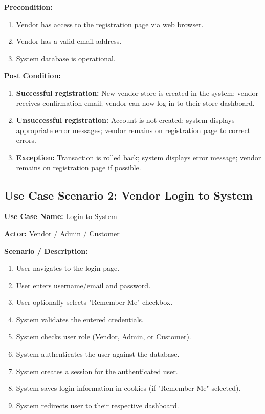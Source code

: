 \textbf{Precondition:}
\begin{enumerate}
    \item Vendor has access to the registration page via web browser.
    \item Vendor has a valid email address.
    \item System database is operational.
\end{enumerate}

\textbf{Post Condition:}
\begin{enumerate}
    \item \textbf{Successful registration:} New vendor store is created in the system; vendor receives confirmation email; vendor can now log in to their store dashboard.
    \item \textbf{Unsuccessful registration:} Account is not created; system displays appropriate error messages; vendor remains on registration page to correct errors.
    \item \textbf{Exception:} Transaction is rolled back; system displays error message; vendor remains on registration page if possible.
\end{enumerate}


\subsection{Use Case Scenario 2: Vendor Login to System}

\textbf{Use Case Name:} Login to System

\textbf{Actor:} Vendor / Admin / Customer

\textbf{Scenario / Description:}
\begin{enumerate}
    \item User navigates to the login page.
    \item User enters username/email and password.
    \item User optionally selects "Remember Me" checkbox.
    \item System validates the entered credentials.
    \item System checks user role (Vendor, Admin, or Customer).
    \item System authenticates the user against the database.
    \item System creates a session for the authenticated user.
    \item System saves login information in cookies (if "Remember Me" selected).
    \item System redirects user to their respective dashboard.
\end{enumerate}

